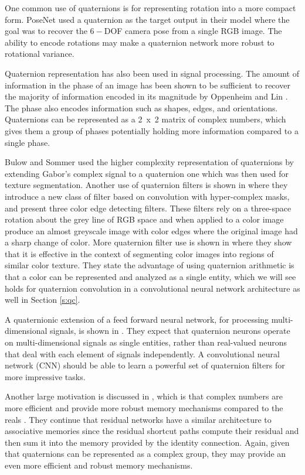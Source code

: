 One common use of quaternions is for representing rotation into a more compact form. 
PoseNet \cite{kendall2015posenet} used a quaternion as the target output in their model where the goal was to recover the $6-$DOF camera pose from a single RGB image.
The ability to encode rotations may make a quaternion network more robust to rotational variance.

Quaternion representation has also been used in signal processing.  
The amount of information in the phase of an image has been shown to be sufficient to recover the majority of information encoded in its magnitude by Oppenheim and Lin \cite{oppenheim1981importance}.
The phase also encodes information such as shapes, edges, and orientations.
Quaternions can be represented as a 2~x~2 matrix of complex numbers, which gives them a group of phases potentially holding more information compared to a single phase.

Bulow and Sommer \cite{bulow2001hypercomplex} used the higher complexity representation of quaternions by extending Gabor's complex signal to a quaternion one which was then used for texture segmentation.
Another use of quaternion filters is shown in \cite{sangwine2000colour} where they introduce a new class of filter based on convolution with hyper-complex masks, and present three color edge detecting filters. 
These filters rely on a three-space rotation about the grey line of RGB space and when applied to a color image produce an almost greyscale image with color edges where the original image had a sharp change of color.
More quaternion filter use is shown in \cite{shi2007quaternion} where they show that it is effective in the context of segmenting color images into regions of similar color texture. 
They state the advantage of using quaternion arithmetic is that a color can be represented and analyzed as a single entity, which we will see holds for quaternion convolution in a convolutional neural network architecture as well in Section \ref{s:qc}.

A quaternionic extension of a feed forward neural network, for processing multi-dimensional signals, is shown in \cite{minemoto2017feed}.
They expect that quaternion neurons operate on multi-dimensional signals as single entities, rather than real-valued neurons that deal with each element of signals independently.
A convolutional neural network (CNN) should be able to learn a powerful set of quaternion filters for more impressive tasks.

Another large motivation is discussed in \cite{trabelsi2017deep}, which is that complex numbers are more efficient and provide more robust memory mechanisms compared to the reals \cite{bulow1999hypercomplex, sangwine2000colour, bulow2001hypercomplex}.
They continue that residual networks have a similar architecture to associative memories since the residual shortcut paths compute their residual and then sum it into the memory provided by the identity connection.
Again, given that quaternions can be represented as a complex group, they may provide an even more efficient and robust memory mechanisms.


